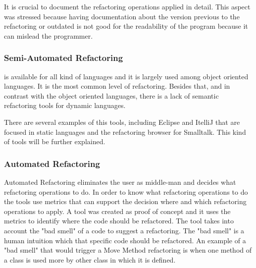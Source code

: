 It is crucial to document the refactoring operations applied in detail. 
This aspect was stressed because having documentation about the version previous to the refactoring or outdated is not good for the readability of the program because it can mislead the programmer.








\subsubsection{Semi-Automated Refactoring}

 is available for all kind of languages and it is largely used among object oriented languages.
It is the most common level of refactoring.
Besides that, and in contrast with the object oriented languages, there is a lack of semantic refactoring tools for dynamic languages.

There are several examples of this tools, including Eclipse and ItelliJ that are focused in static languages and the refactoring browser for Smalltalk.
This kind of tools will be further explained. 

\subsubsection{Automated Refactoring}
Automated Refactoring eliminates the user as middle-man and decides what refactoring operations to do.
In order to know what refactoring operations to do the tools use metrics that can support the decision where and which refactoring operations to apply. 
A tool\cite{simon2001metrics} was created as proof of concept and it uses the metrics to identify where the code should be refactored.
The tool takes into account the "bad smell" of a code to suggest a refactoring. The "bad smell" is a human intuition which that specific code should be refactored. 
An example of a "bad smell" that would trigger a Move Method refactoring is when one method of a class is used more by other class in which it is defined.

